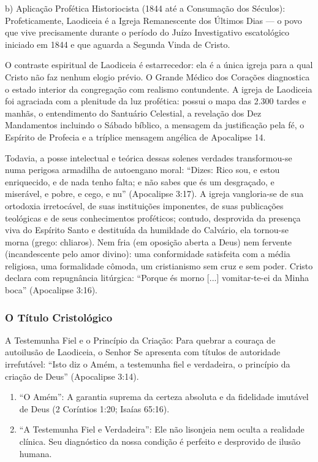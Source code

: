 b) Aplicação Profética Historiocista (1844 até a Consumação dos Séculos):
Profeticamente, Laodiceia é a Igreja Remanescente dos Últimos Dias — o povo que vive precisamente durante o período do Juízo Investigativo escatológico iniciado em 1844 e que aguarda a Segunda Vinda de Cristo.

O contraste espiritual de Laodiceia é estarrecedor: ela é a única igreja para a qual Cristo não faz nenhum elogio prévio. O Grande Médico dos Corações diagnostica o estado interior da congregação com realismo contundente. A igreja de Laodiceia foi agraciada com a plenitude da luz profética: possui o mapa das 2.300 tardes e manhãs, o entendimento do Santuário Celestial, a revelação dos Dez Mandamentos incluindo o Sábado bíblico, a mensagem da justificação pela fé, o Espírito de Profecia e a tríplice mensagem angélica de Apocalipse 14.

Todavia, a posse intelectual e teórica dessas solenes verdades transformou-se numa perigosa armadilha de autoengano moral: ``Dizes: Rico sou, e estou enriquecido, e de nada tenho falta; e não sabes que és um desgraçado, e miserável, e pobre, e cego, e nu'' (Apocalipse 3:17).
A igreja vangloria-se de sua ortodoxia irretocável, de suas instituições imponentes, de suas publicações teológicas e de seus conhecimentos proféticos; contudo, desprovida da presença viva do Espírito Santo e destituída da humildade do Calvário, ela tornou-se morna (grego: chliaros). Nem fria (em oposição aberta a Deus) nem fervente (incandescente pelo amor divino): uma conformidade satisfeita com a média religiosa, uma formalidade cômoda, um cristianismo sem cruz e sem poder. Cristo declara com repugnância litúrgica: ``Porque és morno [...] vomitar-te-ei da Minha boca'' (Apocalipse 3:16).


\subsubsection*{O Título Cristológico}
A Testemunha Fiel e o Princípio da Criação:
Para quebrar a couraça de autoilusão de Laodiceia, o Senhor Se apresenta com títulos de autoridade irrefutável:
``Isto diz o Amém, a testemunha fiel e verdadeira, o princípio da criação de Deus'' (Apocalipse 3:14).
\begin{enumerate}
  \item ``O Amém'': A garantia suprema da certeza absoluta e da fidelidade imutável de Deus (2 Coríntios 1:20; Isaías 65:16).
  \item ``A Testemunha Fiel e Verdadeira'': Ele não lisonjeia nem oculta a realidade clínica. Seu diagnóstico da nossa condição é perfeito e desprovido de ilusão humana.
\end{enumerate}


